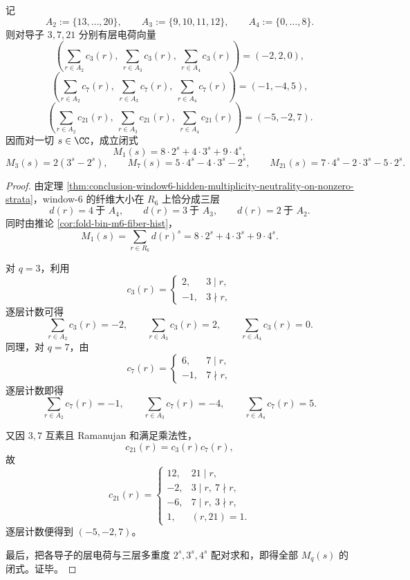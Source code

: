 \begin{theorem}\label{thm:conclusion-window6-output-ramanujan-layer-charge-closedforms}
记
\[
A_2:=\{13,\dots,20\},
\qquad
A_3:=\{9,10,11,12\},
\qquad
A_4:=\{0,\dots,8\}.
\]
则对导子 \(3,7,21\) 分别有层电荷向量
\[
\left(\sum_{r\in A_2}c_3(r),\ \sum_{r\in A_3}c_3(r),\ \sum_{r\in A_4}c_3(r)\right)=(-2,2,0),
\]
\[
\left(\sum_{r\in A_2}c_7(r),\ \sum_{r\in A_3}c_7(r),\ \sum_{r\in A_4}c_7(r)\right)=(-1,-4,5),
\]
\[
\left(\sum_{r\in A_2}c_{21}(r),\ \sum_{r\in A_3}c_{21}(r),\ \sum_{r\in A_4}c_{21}(r)\right)=(-5,-2,7).
\]
因而对一切 \(s\in\CC\)，成立闭式
\[
M_1(s)=8\cdot 2^s+4\cdot 3^s+9\cdot 4^s,
\]
\[
M_3(s)=2(3^s-2^s),
\qquad
M_7(s)=5\cdot 4^s-4\cdot 3^s-2^s,
\qquad
M_{21}(s)=7\cdot 4^s-2\cdot 3^s-5\cdot 2^s.
\]
\end{theorem}
\begin{proof}
由定理 \ref{thm:conclusion-window6-hidden-multiplicity-neutrality-on-nonzero-strata}，window-\(6\) 的纤维大小在 \(R_6\) 上恰分成三层
\[
d(r)=4\ \text{于 }A_4,\qquad d(r)=3\ \text{于 }A_3,\qquad d(r)=2\ \text{于 }A_2.
\]
同时由推论 \ref{cor:fold-bin-m6-fiber-hist}，
\[
M_1(s)=\sum_{r\in R_6}d(r)^s=8\cdot 2^s+4\cdot 3^s+9\cdot 4^s.
\]

对 \(q=3\)，利用
\[
c_3(r)=
\begin{cases}
2,& 3\mid r,\\
-1,& 3\nmid r,
\end{cases}
\]
逐层计数可得
\[
\sum_{r\in A_2}c_3(r)=-2,\qquad
\sum_{r\in A_3}c_3(r)=2,\qquad
\sum_{r\in A_4}c_3(r)=0.
\]
同理，对 \(q=7\)，由
\[
c_7(r)=
\begin{cases}
6,& 7\mid r,\\
-1,& 7\nmid r,
\end{cases}
\]
逐层计数即得
\[
\sum_{r\in A_2}c_7(r)=-1,\qquad
\sum_{r\in A_3}c_7(r)=-4,\qquad
\sum_{r\in A_4}c_7(r)=5.
\]

又因 \(3,7\) 互素且 Ramanujan 和满足乘法性，
\[
c_{21}(r)=c_3(r)c_7(r),
\]
故
\[
c_{21}(r)=
\begin{cases}
12,& 21\mid r,\\
-2,& 3\mid r,\ 7\nmid r,\\
-6,& 7\mid r,\ 3\nmid r,\\
1,& (r,21)=1.
\end{cases}
\]
逐层计数便得到 \((-5,-2,7)\)。

最后，把各导子的层电荷与三层多重度 \(2^s,3^s,4^s\) 配对求和，即得全部 \(M_q(s)\) 的闭式。证毕。
\end{proof}


